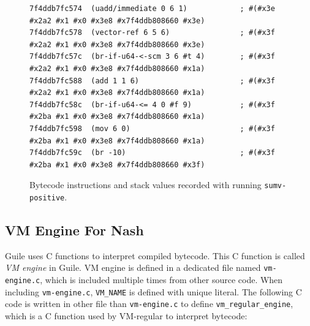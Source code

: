 \documentclass[preprint, 10pt]{sigplanconf}
\begin{document}

\begin{figure}
  \centering
  \small
\begin{verbatim}
7f4ddb7fc574  (uadd/immediate 0 6 1)            ; #(#x3e #x2a2 #x1 #x0 #x3e8 #x7f4ddb808660 #x3e)
7f4ddb7fc578  (vector-ref 6 5 6)                ; #(#x3f #x2a2 #x1 #x0 #x3e8 #x7f4ddb808660 #x3e)
7f4ddb7fc57c  (br-if-u64-<-scm 3 6 #t 4)        ; #(#x3f #x2a2 #x1 #x0 #x3e8 #x7f4ddb808660 #x1a)
7f4ddb7fc588  (add 1 1 6)                       ; #(#x3f #x2a2 #x1 #x0 #x3e8 #x7f4ddb808660 #x1a)
7f4ddb7fc58c  (br-if-u64-<= 4 0 #f 9)           ; #(#x3f #x2ba #x1 #x0 #x3e8 #x7f4ddb808660 #x1a)
7f4ddb7fc598  (mov 6 0)                         ; #(#x3f #x2ba #x1 #x0 #x3e8 #x7f4ddb808660 #x1a)
7f4ddb7fc59c  (br -10)                          ; #(#x3f #x2ba #x1 #x0 #x3e8 #x7f4ddb808660 #x3f)
\end{verbatim}
\caption{Bytecode instructions and stack values recorded with running
  \texttt{sumv-positive}.}
\label{fig:trace}
\end{figure}

\subsection{VM Engine For Nash}

Guile uses C functions to interpret compiled bytecode. This C function is
called \textit{VM engine} in Guile. VM engine is defined in a dedicated file
named \texttt{vm-engine.c}, which is included multiple times from other source
code. When including \texttt{vm-engine.c}, \texttt{VM\_NAME} is defined with
unique literal. The following C code is written in other file than
\texttt{vm-engine.c} to define \texttt{vm\_regular\_engine}, which is a C
function used by VM-regular to interpret bytecode:
\end{document}
